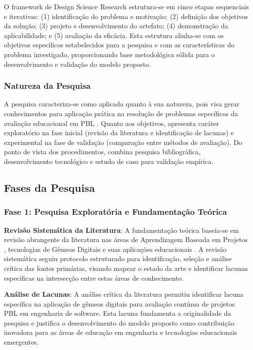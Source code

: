 \documentclass[12pt, a4paper, oneside]{abntex2}
\begin{document}
O framework de Design Science Research estrutura-se em cinco etapas sequenciais e iterativas: (1) identificação do problema e motivação; (2) definição dos objetivos da solução; (3) projeto e desenvolvimento do artefato; (4) demonstração da aplicabilidade; e (5) avaliação da eficácia. Esta estrutura alinha-se com os objetivos específicos estabelecidos para a pesquisa e com as características do problema investigado, proporcionando base metodológica sólida para o desenvolvimento e validação do modelo proposto.

\subsubsection{Natureza da Pesquisa}

A pesquisa caracteriza-se como aplicada quanto à sua natureza, pois visa gerar conhecimentos para aplicação prática na resolução de problemas específicos da avaliação educacional em PBL \cite{gil91}. Quanto aos objetivos, apresenta caráter exploratório na fase inicial (revisão da literatura e identificação de lacunas) e experimental na fase de validação (comparação entre métodos de avaliação). Do ponto de vista dos procedimentos, combina pesquisa bibliográfica, desenvolvimento tecnológico e estudo de caso para validação empírica.

\subsection{Fases da Pesquisa}

\subsubsection{Fase 1: Pesquisa Exploratória e Fundamentação Teórica}

\textbf{Revisão Sistemática da Literatura}: A fundamentação teórica baseia-se em revisão abrangente da literatura nas áreas de Aprendizagem Baseada em Projetos \cite{thomas2000, savery2015, hmelo2004}, tecnologias de Gêmeos Digitais \cite{grieves2014, tao2018, barricelli2019} e suas aplicações educacionais \cite{bachmann2023, silveira2024panorama}. A revisão sistemática seguiu protocolo estruturado para identificação, seleção e análise crítica das fontes primárias, visando mapear o estado da arte e identificar lacunas específicas na intersecção entre estas áreas de conhecimento.

\textbf{Análise de Lacunas}: A análise crítica da literatura permitiu identificar lacuna específica na aplicação de gêmeos digitais para avaliação contínua de projetos PBL em engenharia de software. Esta lacuna fundamenta a originalidade da pesquisa e justifica o desenvolvimento do modelo proposto como contribuição inovadora para as áreas de educação em engenharia e tecnologias educacionais emergentes.
\end{document}
